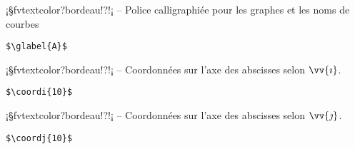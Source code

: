\documentclass[11pt,a4paper,rgb]{report}
\begin{document}
\vspace*{.75cm}

\inCodeStub¡§fvtextcolor?bordeau!?!¡ -- Police calligraphiée pour les graphes et les noms de courbes

\setlength{\leftskip}{.75cm}%
\setlength{\textwidth}{17.25cm}%

\colorbox{blue!15}{}
\hfill
\begin{minipage}{.65\textwidth}
	\begin{lstlisting}[linewidth=\textwidth, language={[LaTeX]TeX}]
	$\glabel{A}$
	\end{lstlisting}
\end{minipage}

\setlength{\leftskip}{0pt}
\setlength{\textwidth}{18cm}%


\vspace*{.75cm}

\inCodeStub¡§fvtextcolor?bordeau!?!¡ -- Coordonnées sur l'axe des abscisses selon $\vv{\imath}$.

\setlength{\leftskip}{.75cm}%
\setlength{\textwidth}{17.25cm}%

\colorbox{blue!15}{}
\hfill
\begin{minipage}{.65\textwidth}
	\begin{lstlisting}[linewidth=\textwidth, language={[LaTeX]TeX}]
	$\coordi{10}$
	\end{lstlisting}
\end{minipage}

\setlength{\leftskip}{0pt}
\setlength{\textwidth}{18cm}%


\vspace*{.75cm}

\inCodeStub¡§fvtextcolor?bordeau!?!¡ -- Coordonnées sur l'axe des abscisses selon $\vv{\jmath}$.

\setlength{\leftskip}{.75cm}%
\setlength{\textwidth}{17.25cm}%

\colorbox{blue!15}{}
\hfill
\begin{minipage}{.65\textwidth}
	\begin{lstlisting}[linewidth=\textwidth, language={[LaTeX]TeX}]
	$\coordj{10}$
	\end{lstlisting}
\end{minipage}
\end{document}
